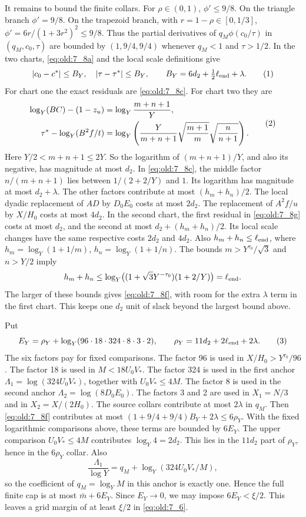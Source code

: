 It remains to bound the finite collars. For
\(\rho\in(0,1)\), \(\phi'\le9/8\). On the triangle branch
\(\phi'=9/8\). On the trapezoid branch, with
\(r=1-\rho\in[0,1/3]\),
\(\phi'=6r/(1+3r^2)^2\le9/8\). Thus the partial derivatives of
\(q_M\phi(c_0/\tau)\) in \((q_M,c_0,\tau)\) are bounded by
\((1,9/4,9/4)\) whenever \(q_M<1\) and \(\tau>1/2\). In the two
charts, \eqref{eq:old:7_8a} and the local scale definitions give
\[
 |c_0-c^*|\le B_Y,\quad |\tau-\tau^*|\le B_Y,
 \qquad B_Y=6d_2+\tfrac12\ell_{\rm end}+\lambda.
\AutoTag{eq:old:7_8f}
\]
For chart one the exact residuals are \eqref{eq:old:7_8c}. For chart two
they are
\[
\begin{aligned}
 \log_Y(BC)-(1-z_u)&=\log_Y\frac{m+n+1}{Y},\\
 \tau^*-\log_Y(B^2f/t)
 &=\log_Y\left(\frac{Y}{m+n+1}
             \sqrt{\frac{m+1}{m}}\sqrt{\frac{n}{n+1}}\right).
\end{aligned}
\AutoTag{eq:old:7_8g}
\]
Here \(Y/2<m+n+1\le2Y\). So the logarithm of
\((m+n+1)/Y\), and also its negative, has magnitude at most \(d_2\).
In \eqref{eq:old:7_8c}, the middle factor \(n/(m+n+1)\) lies between
\(1/(2+2/Y)\) and \(1\). Its logarithm has magnitude at most
\(d_2+\lambda\). The other factors contribute at most
\((h_m+h_n)/2\). The local dyadic replacement of \(AD\) by \(D_0E_0\)
costs at most \(2d_2\). The replacement of \(A^2f/u\) by \(X/H_0\)
costs at most \(4d_2\). In the second chart, the first residual in
\eqref{eq:old:7_8g} costs at most \(d_2\), and the second at most
\(d_2+(h_m+h_n)/2\). Its local scale changes have the same respective
costs \(2d_2\) and \(4d_2\). Also \(h_m+h_n\le\ell_{\rm end}\), where
\(h_m=\log_Y(1+1/m)\), \(h_n=\log_Y(1+1/n)\). The bounds
\(m>Y^{\tau_0}/\sqrt3\) and \(n>Y/2\) imply
\[
 h_m+h_n\le
 \log_Y\bigl((1+\sqrt3Y^{-\tau_0})(1+2/Y)\bigr)
 =\ell_{\rm end}.
\]
The larger of these bounds gives \eqref{eq:old:7_8f}, with room for the
extra \(\lambda\) term in the first chart. This keeps one
\(d_2\) unit of slack beyond the largest bound above.

Put
\[
 E_Y=\rho_Y+\log_Y(96\cdot18\cdot324\cdot8\cdot3\cdot2),
 \qquad \rho_Y=11d_2+2\ell_{\rm end}+2\lambda.
\AutoTag{eq:old:7_8h}
\]
The six factors pay for fixed comparisons. The factor 96 is used
in \(X/H_0>Y^{\tau_0}/96\). The factor 18 is used in \(M<18U_0V_*\).
The factor 324 is used in
the first anchor \(\Lambda_1=\log(324U_0V_*)\), together with
\(U_0V_*\le4M\). The factor 8 is used in the second anchor
\(\Lambda_2=\log(8D_0E_0)\). The factors 3 and 2 are used in \(X_1=N/3\)
and in \(X_2=X/(2H_0)\). The source collars contribute at most
\(2\lambda\) in \(q_M\). Then \eqref{eq:old:7_8f} contributes at most
\((1+9/4+9/4)B_Y+2\lambda\le6\rho_Y\). With the fixed logarithmic
comparisons above, these terms are bounded by \(6E_Y\).
The upper comparison \(U_0V_*\le4M\) contributes \(\log_Y4=2d_2\).
This lies in the \(11d_2\) part of \(\rho_Y\), hence in the
\(6\rho_Y\) collar. Also
\[
 \frac{\Lambda_1}{\log Y}=q_M+\log_Y(324U_0V_*/M),
\]
so the coefficient of \(q_M=\log_YM\) in this anchor is exactly one.
Hence the full finite cap is at most \(\bar m+6E_Y\). Since \(E_Y\to0\),
we may impose \(6E_Y<\xi/2\). This leaves a grid margin of at least
\(\xi/2\) in \eqref{eq:old:7_6}.

